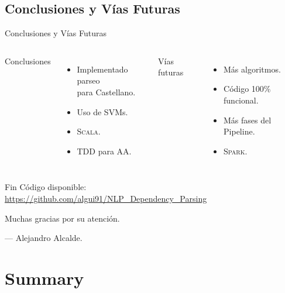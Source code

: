 \documentclass{beamer}
\begin{document}
\subsection[Conclusiones]{Conclusiones y Vías Futuras}
\begin{frame}{Conclusiones y Vías Futuras}
  \begin{columns}[onlytextwidth,t]
    Conclusiones
    \begin{itemize}
    \item Implementado parseo\\ para \alert{Castellano}.
    \item Uso de \alert{SVMs}.
    \item \textsc{Scala}.
    \item \alert{TDD} para AA.
    \end{itemize}
    Vías futuras
    \begin{itemize}
    \item Más algoritmos.
    \item Código 100\% funcional.
    \item Más fases del \alert{Pipeline}.
    \item \textsc{Spark}.
    \end{itemize}
  \end{columns}
\end{frame}

\begin{frame}{Fin}
  Código disponible:\\\url{https://github.com/algui91/NLP_Dependency_Parsing}
  \bigskip

  Muchas gracias por su atención.

  --- Alejandro Alcalde.
\end{frame}

\section*{Summary}
\end{document}

